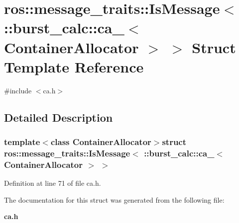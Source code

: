 \section{ros\-:\-:message\-\_\-traits\-:\-:\-Is\-Message$<$ \-:\-:burst\-\_\-calc\-:\-:ca\-\_\-$<$ \-Container\-Allocator $>$ $>$ \-Struct \-Template \-Reference}
\label{structros_1_1message__traits_1_1IsMessage_3_01_1_1burst__calc_1_1ca___3_01ContainerAllocator_01_4_01_4}


{\ttfamily \#include $<$ca.\-h$>$}



\subsection{\-Detailed \-Description}
\subsubsection*{template$<$class Container\-Allocator$>$struct ros\-::message\-\_\-traits\-::\-Is\-Message$<$ \-::burst\-\_\-calc\-::ca\-\_\-$<$ Container\-Allocator $>$ $>$}



\-Definition at line 71 of file ca.\-h.



\-The documentation for this struct was generated from the following file\-:\begin{DoxyCompactItemize}
\item 
{\bf ca.\-h}\end{DoxyCompactItemize}
